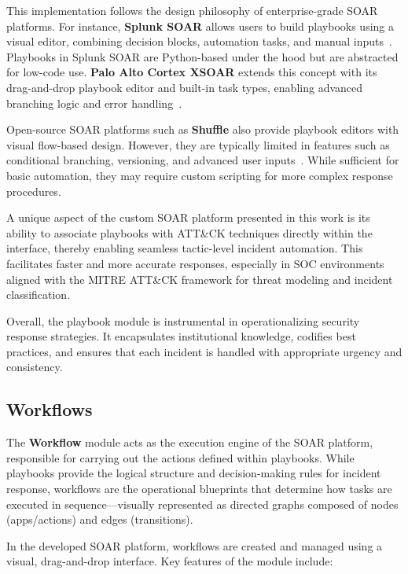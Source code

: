 This implementation follows the design philosophy of enterprise-grade SOAR platforms. For instance, \textbf{Splunk SOAR} allows users to build playbooks using a visual editor, combining decision blocks, automation tasks, and manual inputs~\cite{splunk}. Playbooks in Splunk SOAR are Python-based under the hood but are abstracted for low-code use. \textbf{Palo Alto Cortex XSOAR} extends this concept with its drag-and-drop playbook editor and built-in task types, enabling advanced branching logic and error handling~\cite{paloalto}.

Open-source SOAR platforms such as \textbf{Shuffle} also provide playbook editors with visual flow-based design. However, they are typically limited in features such as conditional branching, versioning, and advanced user inputs~\cite{techtarget}. While sufficient for basic automation, they may require custom scripting for more complex response procedures.

A unique aspect of the custom SOAR platform presented in this work is its ability to associate playbooks with ATT\&CK techniques directly within the interface, thereby enabling seamless tactic-level incident automation. This facilitates faster and more accurate responses, especially in SOC environments aligned with the MITRE ATT\&CK framework for threat modeling and incident classification.

Overall, the playbook module is instrumental in operationalizing security response strategies. It encapsulates institutional knowledge, codifies best practices, and ensures that each incident is handled with appropriate urgency and consistency.

\subsection{Workflows}

The \textbf{Workflow} module acts as the execution engine of the SOAR platform, responsible for carrying out the actions defined within playbooks. While playbooks provide the logical structure and decision-making rules for incident response, workflows are the operational blueprints that determine how tasks are executed in sequence—visually represented as directed graphs composed of nodes (apps/actions) and edges (transitions).

In the developed SOAR platform, workflows are created and managed using a visual, drag-and-drop interface. Key features of the module include:

